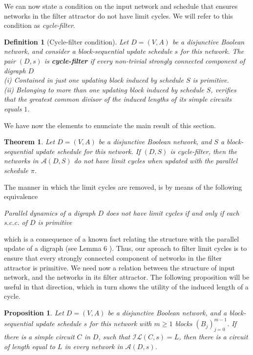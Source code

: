 \documentclass[preprint,12pt]{elsarticle}
\newtheorem{defn}{Definition}[section]
\newtheorem {teo}{Theorem}
\newtheorem{prop}{Proposition}
\begin{document}
We can now state a condition on the input network and schedule that ensures networks in the filter attractor do not have limit cycles. We will refer to this condition as \textit{cycle-filter}.

\begin{defn}[Cycle-filter condition]\label{cond}
Let $D=(V,A)$ be a disjunctive Boolean network, and consider a block-sequential update schedule $s$ for this network. The pair $(D,s)$ is \textbf{cycle-filter} if every non-trivial strongly connected component of digraph $D$\\
(i)  Contained in just one updating block induced by schedule $S$ is primitive.\\
(ii) Belonging to more than one updating block induced by schedule $S$, verifies that the greatest common divisor of the induced lengths of its simple circuits equals $1$. 
\end{defn}

We have now the elements to enunciate the main result of this section.

\begin{teo}\label{filt}
Let $D=(V,A)$ be a disjunctive Boolean network, and $S$ a block-sequential update schedule for this network. If $(D,S)$ is cycle-filter, then the networks in $\mathcal{A}(D,S)$ do not have limit cycles when updated with the parallel schedule $\pi$. 
\end{teo}

The manner in which the limit cycles are removed, is by means of the following equivalence
\begin{center}
\textit{Parallel dynamics of a digraph $D$ does not have limit cycles if and only if each s.c.c. of $D$ is primitive}
\end{center}
which is a consequence of a known fact relating the structure with the parallel update of a digraph (see Lemma 6 \cite{disj}). Thus, our aproach to filter limit cycles is to ensure that every strongly connected component of networks in the filter attractor is primitive. We need now a relation between the structure of input network, and the networks in its filter attractor. The following proposition will be useful in that direction, which in turn shows the utility of the induced length of a cycle.

\begin{prop}\label{ind_l}
Let $D=(V,A)$ be a disjunctive Boolean network, and a block-sequential update schedule $s$ for this network with $m\geq 1$ blocks $(B_j)_{j=0}^{m-1}$. If there is a simple circuit $C$ in $D$, such that $\mathcal{IL}(C,s)=L$, then there is a circuit of length equal to $L$ in every network in $\mathcal{A}(D,s)$.
\end{prop} 
\end{document}
